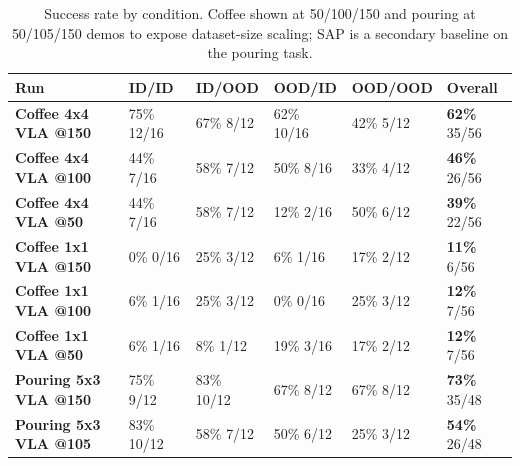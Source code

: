 \documentclass[10pt]{article}
\begin{document}
\begin{table}[ht]\centering\small
\renewcommand{\arraystretch}{1.25}
\caption{Success rate by condition. Coffee shown at 50/100/150 and pouring at 50/105/150 demos to expose dataset-size scaling; SAP is a secondary baseline on the pouring task.}
\begin{tabular}{>{\raggedright\arraybackslash}p{3.6cm}C{2.15cm}C{2.15cm}C{2.15cm}C{2.15cm}C{2.15cm}}
\toprule
\textbf{Run} & \textbf{ID/ID} & \textbf{ID/OOD} & \textbf{OOD/ID} & \textbf{OOD/OOD} & \textbf{Overall} \\
\midrule
\textbf{Coffee 4x4 VLA @150} & 75\% {\tiny 12/16} & 67\% {\tiny 8/12} & 62\% {\tiny 10/16} & 42\% {\tiny 5/12} & \textbf{62\%} {\tiny 35/56} \\
\textbf{Coffee 4x4 VLA @100} & 44\% {\tiny 7/16} & 58\% {\tiny 7/12} & 50\% {\tiny 8/16} & 33\% {\tiny 4/12} & \textbf{46\%} {\tiny 26/56} \\
\textbf{Coffee 4x4 VLA @50} & 44\% {\tiny 7/16} & 58\% {\tiny 7/12} & 12\% {\tiny 2/16} & 50\% {\tiny 6/12} & \textbf{39\%} {\tiny 22/56} \\
\textbf{Coffee 1x1 VLA @150} & 0\% {\tiny 0/16} & 25\% {\tiny 3/12} & 6\% {\tiny 1/16} & 17\% {\tiny 2/12} & \textbf{11\%} {\tiny 6/56} \\
\textbf{Coffee 1x1 VLA @100} & 6\% {\tiny 1/16} & 25\% {\tiny 3/12} & 0\% {\tiny 0/16} & 25\% {\tiny 3/12} & \textbf{12\%} {\tiny 7/56} \\
\textbf{Coffee 1x1 VLA @50} & 6\% {\tiny 1/16} & 8\% {\tiny 1/12} & 19\% {\tiny 3/16} & 17\% {\tiny 2/12} & \textbf{12\%} {\tiny 7/56} \\
\textbf{Pouring 5x3 VLA @150} & 75\% {\tiny 9/12} & 83\% {\tiny 10/12} & 67\% {\tiny 8/12} & 67\% {\tiny 8/12} & \textbf{73\%} {\tiny 35/48} \\
\textbf{Pouring 5x3 VLA @105} & 83\% {\tiny 10/12} & 58\% {\tiny 7/12} & 50\% {\tiny 6/12} & 25\% {\tiny 3/12} & \textbf{54\%} {\tiny 26/48} \\

\end{tabular}
\end{table}
\end{document}
